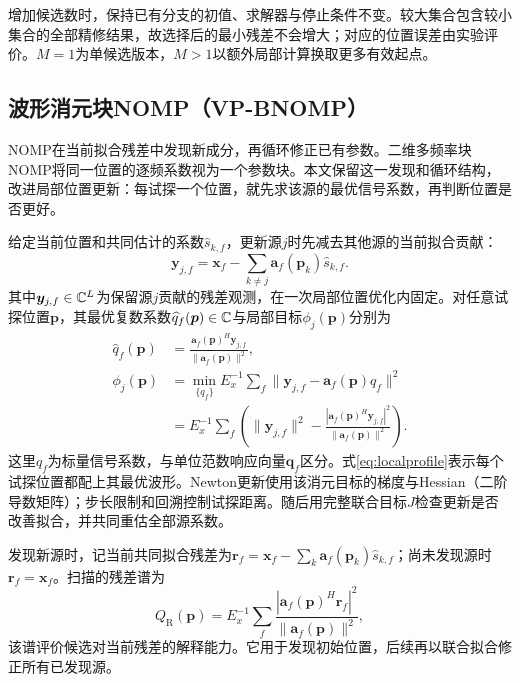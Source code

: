 增加候选数时，保持已有分支的初值、求解器与停止条件不变。较大集合包含较小集合的全部精修结果，故选择后的最小残差不会增大；对应的位置误差由实验评价。$M=1$为单候选版本，$M>1$以额外局部计算换取更多有效起点。

\subsection{波形消元块NOMP（VP-BNOMP）}\label{sec:vpnomp}
NOMP在当前拟合残差中发现新成分，再循环修正已有参数\cite{Mamandipoor2016}。二维多频率块NOMP将同一位置的逐频系数视为一个参数块\cite{Yang2022}。本文保留这一发现和循环结构，改进局部位置更新：每试探一个位置，就先求该源的最优信号系数，再判断位置是否更好。

给定当前位置和共同估计的系数$\widehat s_{k,f}$，更新源$j$时先减去其他源的当前拟合贡献：
\begin{equation}
 \bm y_{j,f}=\bm x_f-\sum_{k\ne j}\bm a_f(\bm p_k)\widehat s_{k,f} .
 \label{eq:targetResidual}
\end{equation}
其中$\bm y_{j,f}\in\mathbb C^L$为保留源$j$贡献的残差观测，在一次局部位置优化内固定。对任意试探位置$\bm p$，其最优复数系数$\widehat q_f(\bm p)\in\mathbb C$与局部目标$\phi_j(\bm p)$分别为
\begin{align}
 \widehat q_f(\bm p)&=\frac{\bm a_f(\bm p)^H\bm y_{j,f}}
 {\|\bm a_f(\bm p)\|^2},\label{eq:localcoef}\\
 \phi_j(\bm p)&=\min_{\{q_f\}}E_x^{-1}\sum_f
 \|\bm y_{j,f}-\bm a_f(\bm p)q_f\|^2\nonumber\\
 &=E_x^{-1}\sum_f\left(\|\bm y_{j,f}\|^2-
 \frac{|\bm a_f(\bm p)^H\bm y_{j,f}|^2}{\|\bm a_f(\bm p)\|^2}\right).
 \label{eq:localprofile}
\end{align}
这里$q_f$为标量信号系数，与单位范数响应向量$\bm q_f$区分。式\eqref{eq:localprofile}表示每个试探位置都配上其最优波形。Newton更新使用该消元目标的梯度与Hessian（二阶导数矩阵）；步长限制和回溯控制试探距离。随后用完整联合目标$J$检查更新是否改善拟合，并共同重估全部源系数。

发现新源时，记当前共同拟合残差为$\bm r_f=\bm x_f-\sum_k\bm a_f(\bm p_k)\widehat s_{k,f}$；尚未发现源时$\bm r_f=\bm x_f$。扫描的残差谱为
\begin{equation}
 Q_{\mathrm R}(\bm p)=E_x^{-1}\sum_f
 \frac{|\bm a_f(\bm p)^H\bm r_f|^2}{\|\bm a_f(\bm p)\|^2},
 \label{eq:residualScore}
\end{equation}
该谱评价候选对当前残差的解释能力。它用于发现初始位置，后续再以联合拟合修正所有已发现源。

